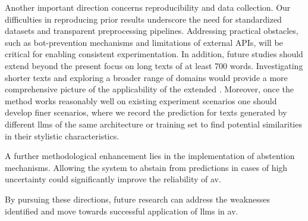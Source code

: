 Another important direction concerns reproducibility and data collection. 
Our difficulties in reproducing prior results underscore the need for standardized datasets and transparent preprocessing pipelines. 
Addressing practical obstacles, such as bot-prevention mechanisms and limitations of external APIs, will be critical for enabling consistent experimentation. 
In addition, future studies should extend beyond the present focus on long texts of at least 700 words. 
Investigating shorter texts and exploring a broader range of domains would provide a more comprehensive picture of the applicability of the extended \impAppr{}.
Moreover, once the method works reasonably well on existing experiment scenarios one should develop finer scenarios, where we record the prediction for texts generated by different \acp{llm} of the same architecture or training set to find potential similarities in their stylistic characteristics.

A further methodological enhancement lies in the implementation of abstention mechanisms. 
Allowing the system to abstain from predictions in cases of high uncertainty could significantly improve the reliability of \ac{av}. 

By pursuing these directions, future research can address the weaknesses identified and move towards successful application of \acp{llm} in \ac{av}.




% 





